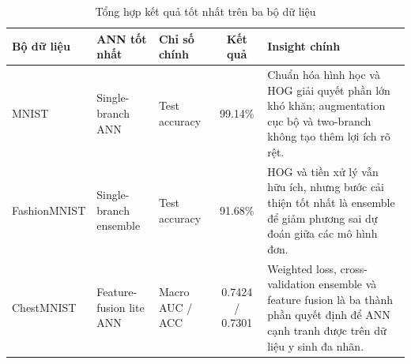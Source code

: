 \begin{table}[H]
\centering
\caption{Tổng hợp kết quả tốt nhất trên ba bộ dữ liệu}
\label{tab:overall-project-summary}
\begin{tabularx}{\textwidth}{l l l c >{\raggedright\arraybackslash}X}
\toprule
Bộ dữ liệu & ANN tốt nhất & Chỉ số chính & Kết quả & Insight chính \\
\midrule
MNIST & Single-branch ANN & Test accuracy & 99.14\% & Chuẩn hóa hình học và HOG giải quyết phần lớn khó khăn; augmentation cục bộ và two-branch không tạo thêm lợi ích rõ rệt. \\
FashionMNIST & Single-branch ensemble & Test accuracy & 91.68\% & HOG và tiền xử lý vẫn hữu ích, nhưng bước cải thiện tốt nhất là ensemble để giảm phương sai dự đoán giữa các mô hình đơn. \\
ChestMNIST & Feature-fusion lite ANN & Macro AUC / ACC & 0.7424 / 0.7301 & Weighted loss, cross-validation ensemble và feature fusion là ba thành phần quyết định để ANN cạnh tranh được trên dữ liệu y sinh đa nhãn. \\
\bottomrule
\end{tabularx}
\end{table}

